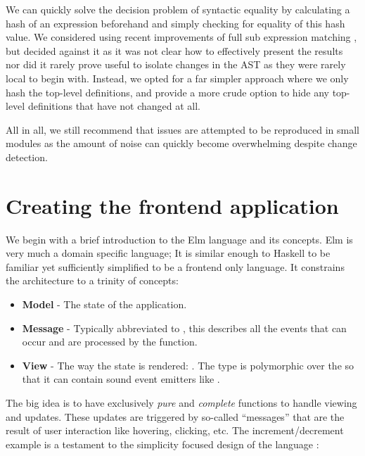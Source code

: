 We can quickly solve the decision problem of syntactic equality by calculating a hash of an expression beforehand
and simply checking for equality of this hash value. We considered using recent improvements of full sub expression
matching \cite{hashing_mod_alpha}, but decided against it as it was not clear how to effectively present the results
nor did it rarely prove useful to isolate changes in the AST as they were rarely local to begin with.
Instead, we opted for a far simpler approach where we only hash the top-level definitions, and provide a more crude
option to hide any top-level definitions that have not changed at all.

All in all, we still recommend that issues are attempted to be reproduced in small modules as the amount of
noise can quickly become overwhelming despite change detection.

\section{Creating the frontend application}

We begin with a brief introduction to the Elm language and its concepts. Elm is very much a domain specific language; It is 
similar enough to Haskell to be familiar yet sufficiently simplified to be a frontend only language. It constrains the architecture
to a trinity of concepts: 

\begin{itemize}
  \item \textbf{Model} - The state of the application.
  \item \textbf{Message} - Typically abbreviated to , this describes all the events that can occur and are processed by the  function.
  \item \textbf{View} - The way the state is rendered: . The  type is polymorphic over the  so that it can contain sound event emitters like .
\end{itemize}

The big idea is to have exclusively \textit{pure} and \textit{complete} functions to handle viewing and updates.
These updates are triggered by so-called ``messages'' that are the result of user interaction like hovering, clicking, etc.
The increment/decrement example is a testament to the simplicity focused design of the language \cite{elm_lang}:


